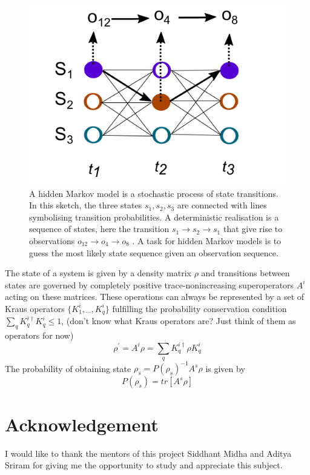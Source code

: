 \documentclass[conference]{IEEEtran}
\begin{document}
\begin{figure}[htbp]
\centerline{\includegraphics[scale = 0.3]{Images/markov.png}}
\caption{A hidden Markov model
is a stochastic process of state transitions. In this
sketch, the three states $s_1 , s_2 , s_3$ are connected with
lines symbolising transition probabilities. A deterministic realisation is a sequence of states, here the
transition $s_1 \to s_2 \to s_1$ that give rise to observations $o_{12} \to o_4  \to o_8$ . A task for hidden Markov models
is to guess the most likely state sequence given an observation sequence.}
\label{markov}
\end{figure}

The state of a system is given by a density matrix $\rho$ and transitions between
states are governed by completely positive trace-nonincreasing superoperators $A^i$ acting on these matrices.
These operations can always be represented by a set of Kraus operators $\{K_{1}^{i}, {}_{\cdots}, K_{q}^{i}\}$
fulfilling the probability conservation condition $\sum_{q} K_{q}^{i\dag}K_{q}^{i} \leq 1$, (don't know what Kraus operators are? Just think of them as operators for now)
\begin{equation*}
    \rho^{'} = A^{i}\rho = \sum_{q} K_{q}^{i\dag}\rho K_{q}^{i}
\end{equation*}
The probability of obtaining state $\rho_s = P(\rho_s)^{-1}A^{s}\rho$ is given by
\begin{equation*}
    P(\rho_s) = tr[A^{s}\rho]
\end{equation*}


\section*{Acknowledgement}
I would like to thank the mentors of this project Siddhant Midha and Aditya Sriram for giving 
me the opportunity to study and appreciate this subject. 
\end{document}
